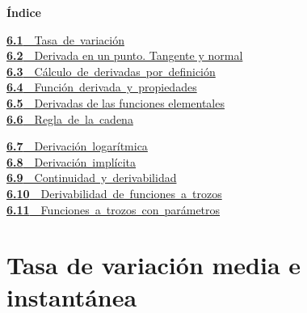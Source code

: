 \documentclass[11pt,a4paper]{article}
\begin{document}
\begin{tcolorbox}[colback=fmsurface,colframe=fmsurface,arc=3mm,left=4mm,right=4mm,top=2mm,bottom=2mm]
\small\textbf{Índice}\par\smallskip
\begin{minipage}[t]{0.49\linewidth}\small \mbox{\hyperlink{sec1}{\textbf{\color{fmgreen}6.1}\ \ Tasa de variación}}\\[3pt]
\hyperlink{sec2}{\textbf{\color{fmgreen}6.2}\ \ Derivada en un punto. Tangente y normal}\\[3pt]
\mbox{\hyperlink{sec3}{\textbf{\color{fmgreen}6.3}\ \ Cálculo de derivadas por definición}}\\[3pt]
\mbox{\hyperlink{sec4}{\textbf{\color{fmgreen}6.4}\ \ Función derivada y propiedades}}\\[3pt]
\hyperlink{sec5}{\textbf{\color{fmgreen}6.5}\ \ Derivadas de las funciones elementales}\\[3pt]
\mbox{\hyperlink{sec6}{\textbf{\color{fmgreen}6.6}\ \ Regla de la cadena}}\\[3pt]\end{minipage}\hfill\begin{minipage}[t]{0.49\linewidth}\small \mbox{\hyperlink{sec7}{\textbf{\color{fmgreen}6.7}\ \ Derivación logarítmica}}\\[3pt]
\mbox{\hyperlink{sec8}{\textbf{\color{fmgreen}6.8}\ \ Derivación implícita}}\\[3pt]
\mbox{\hyperlink{sec9}{\textbf{\color{fmgreen}6.9}\ \ Continuidad y derivabilidad}}\\[3pt]
\mbox{\hyperlink{sec10}{\textbf{\color{fmgreen}6.10}\ \ Derivabilidad de funciones a trozos}}\\[3pt]
\mbox{\hyperlink{sec11}{\textbf{\color{fmgreen}6.11}\ \ Funciones a trozos con parámetros}}\\[3pt]\end{minipage}
\end{tcolorbox}

\section{Tasa de variación media e instantánea}\hypertarget{sec1}{}
\end{document}
